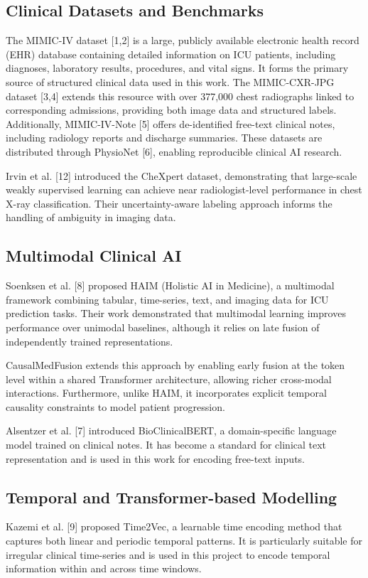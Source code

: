 \documentclass{fisatprojectfinal}
\begin{document}
\subsection{Clinical Datasets and Benchmarks}
The MIMIC-IV dataset [1,2] is a large, publicly available electronic health record (EHR) database containing detailed information on ICU patients, including diagnoses, laboratory results, procedures, and vital signs. It forms the primary source of structured clinical data used in this work. The MIMIC-CXR-JPG dataset [3,4] extends this resource with over 377,000 chest radiographs linked to corresponding admissions, providing both image data and structured labels. Additionally, MIMIC-IV-Note [5] offers de-identified free-text clinical notes, including radiology reports and discharge summaries. These datasets are distributed through PhysioNet [6], enabling reproducible clinical AI research.

Irvin et al. [12] introduced the CheXpert dataset, demonstrating that large-scale weakly supervised learning can achieve near radiologist-level performance in chest X-ray classification. Their uncertainty-aware labeling approach informs the handling of ambiguity in imaging data.

\subsection{Multimodal Clinical AI}
Soenksen et al. [8] proposed HAIM (Holistic AI in Medicine), a multimodal framework combining tabular, time-series, text, and imaging data for ICU prediction tasks. Their work demonstrated that multimodal learning improves performance over unimodal baselines, although it relies on late fusion of independently trained representations.

CausalMedFusion extends this approach by enabling early fusion at the token level within a shared Transformer architecture, allowing richer cross-modal interactions. Furthermore, unlike HAIM, it incorporates explicit temporal causality constraints to model patient progression.

Alsentzer et al. [7] introduced BioClinicalBERT, a domain-specific language model trained on clinical notes. It has become a standard for clinical text representation and is used in this work for encoding free-text inputs.

\subsection{Temporal and Transformer-based Modelling}
Kazemi et al. [9] proposed Time2Vec, a learnable time encoding method that captures both linear and periodic temporal patterns. It is particularly suitable for irregular clinical time-series and is used in this project to encode temporal information within and across time windows.
\end{document}
